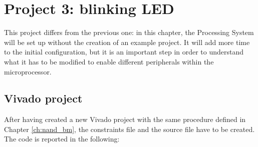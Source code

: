 \chapter{Project 3: blinking LED}  \label{ch:blink_1}
This project differs from the previous one: in this chapter, the Processing System will be set up without the creation of an example project. It will add more time to the initial configuration, but it is an important step in order to understand what it has to be modified to enable different peripherals within the microprocessor.


\section{Vivado project}
After having created a new Vivado project with the same procedure defined in Chapter \ref{ch:nand_bm}, the constraints file and the source file have to be created. The code is reported in the following:
